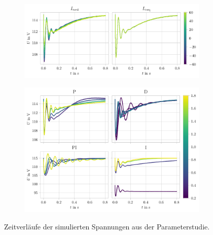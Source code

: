 \begin{figure}[ht]\ContinuedFloat
    \begin{subfigure}{\textwidth}
        \centering
        \includegraphics{Bilder/ParameterSweep_RotorStreuinduk.pdf}
        \label{fig:InduktivitatenSweepB}
    \end{subfigure}
    \begin{subfigure}{\textwidth}
        \centering
        \includegraphics{Bilder/simulation_reglerSweepSpannungen.pdf}
    \label{fig:SpannungenReglerSweep}
    \end{subfigure}
    \caption{Zeitverläufe der simulierten Spannungen aus der Parameterstudie.}
    \label{fig:ZeitverlauefeSpannungenParametersweep}
\end{figure}
